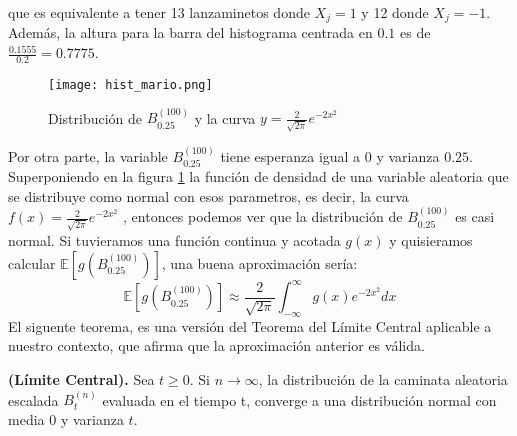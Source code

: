 \documentclass[11pt,notitlepage]{article}
\begin{document}
que es equivalente a tener 13 lanzaminetos donde $X_j = 1$ y 12 donde $X_j = -1$. Además, la altura para la barra del histograma centrada en $0.1$ es de $\frac{0.1555}{0.2} = 0.7775$. \\
\begin{figure}[htb]
\centering
\texttt{[image: hist\_mario.png]}
\caption{Distribución de $B^{(100)}_{0.25}$ y la curva $y = \frac{2}{\sqrt{2\pi}}e^{-2x^2}$}
\label{secc1.6_fig1}
\end{figure}
\linebreak
Por otra parte, la variable $B^{(100)}_{0.25}$ tiene esperanza igual a $0$ y varianza $0.25$. Superponiendo en la figura \ref{secc1.6_fig1} la función de densidad de una variable aleatoria que se distribuye como normal con esos parametros, es decir, la curva $f(x) = \frac{2}{\sqrt{2\pi}}e^{-2x^2}$ , entonces podemos ver que la distribución de $B^{(100)}_{0.25}$ es casi normal. Si tuvieramos  una función continua y acotada $g(x)$ y quisieramos calcular $\mathbb{E}\left[g\left(B^{(100)}_{0.25}\right)\right]$, una buena aproximación sería:
\[\mathbb{E}\left[g\left(B^{(100)}_{0.25}\right)\right] \approx \frac{2}{\sqrt{2\pi}}\int_{-\infty}^{\infty} g(x)e^{-2x^2}dx\]
El siguente teorema, es una versión del Teorema del Límite Central aplicable a nuestro contexto, que afirma que la aproximación anterior es válida.
\begin{teor}\label{secc1.6_teo1}
\textbf{(Límite Central).} Sea $t \geq 0 $. Si $n \rightarrow \infty$, la distribución de la caminata aleatoria escalada $B^{(n)}_{t}$ evaluada en el tiempo t, converge a una distribución normal con media $0$ y varianza $t$.
\end{teor}
\end{document}
